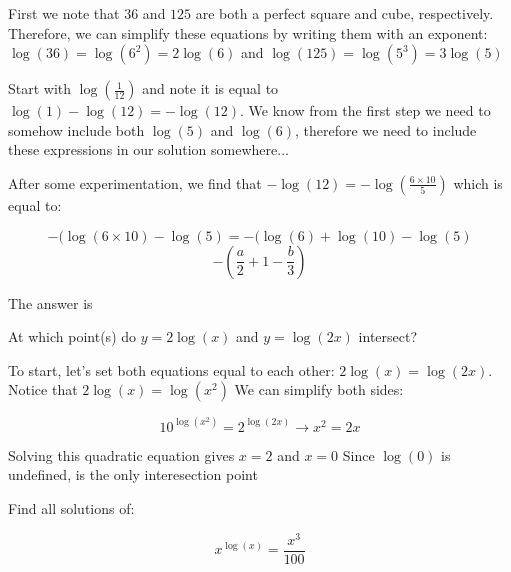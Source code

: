 \begin{solution}

First we note that $36$ and $125$ are both a perfect square and cube, respectively. Therefore, we can simplify these equations by writing them with an exponent: 
$\log(36) = \log(6^2) = 2\log(6)$ and $\log(125) = \log(5^3) = 3\log(5)$

Start with $\log(\frac{1}{12})$ and note it is equal to $\log(1)-\log(12) = -\log(12)$. We know from the first step we need to somehow include both $\log(5)$ and $\log(6)$, therefore we need to include these expressions in our solution somewhere...

After some experimentation, we find that $-\log(12) = -\log(\frac{6 \times 10}{5})$ which is equal to:

$$-(\log(6 \times 10) - \log(5) = -(\log(6)+\log(10)-\log(5)$$
$$-(\frac{a}{2}+1-\frac{b}{3})$$

The answer is 

\end{solution}


\begin{question}

At which point(s) do $y=2\log(x)$ and $y=\log(2x)$ intersect?

\end{question}

\begin{solution}

To start, let's set both equations equal to each other: $2\log(x)=\log(2x)$. Notice that 
$2\log(x)=\log(x^2)$ We can simplify both sides:

$$10^{\log(x^2)}=2^{\log(2x)} \rightarrow x^2 = 2x $$

Solving this quadratic equation gives $x=2$ and $x=0$ Since $\log(0)$ is undefined,
 is the only interesection point

\newpage
\end{solution}

\begin{question}

Find all solutions of:

$$x^{\log(x)} = \frac{x^3}{100}$$

\end{question}

